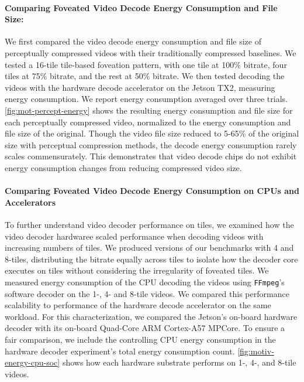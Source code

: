\paragraph{Comparing Foveated Video Decode Energy Consumption and File Size:} We first compared the video decode energy consumption and file size of perceptually compressed videos with their traditionally compressed baselines.
We tested a 16-tile tile-based foveation pattern, with one tile at 100\% bitrate, four tiles at 75\% bitrate, and the rest at 50\% bitrate.
We then tested decoding the videos with the hardware decode accelerator on the Jetson TX2, measuring energy consumption.
We report energy consumption averaged over three trials.
\ref{fig:mot-percept-energy} shows the resulting energy consumption and file size for each perceptually compressed video, normalized to the energy consumption and file size of the original.
Though the video file size reduced to 5-65\% of the original size with perceptual compression methods, the decode energy consumption rarely scales commensurately.
This demonstrates that video decode chips do not exhibit energy consumption changes from reducing compressed video size.

\motPerceptualEnergy

\paragraph{Comparing Foveated Video Decode Energy Consumption on CPUs and Accelerators}

To further understand video decoder performance on tiles, we examined how the video decoder hardwaree scaled performance when decoding videos with increasing numbers of tiles.
We produced versions of our benchmarks with 4 and 8-tiles, distributing the bitrate equally across tiles to isolate how the decoder core executes on tiles without considering the irregularity of foveated tiles.
We measured energy consumption of the CPU decoding the videos using \texttt{FFmpeg}'s software \hevc decoder on the 1-, 4- and 8-tile videos.
We compared this performance scalability to performance of the hardware decode accelerator on the same workload.
For this characterization, we compared the Jetson's on-board hardware decoder with its on-board Quad-Core ARM Cortex-A57 MPCore.
To ensure a fair comparison, we include the controlling CPU energy consumption in the hardware decoder experiment's total energy consumption count.
\ref{fig:motiv-energy-cpu-soc} shows how each hardware substrate performs on 1-, 4-, and 8-tile videos.

